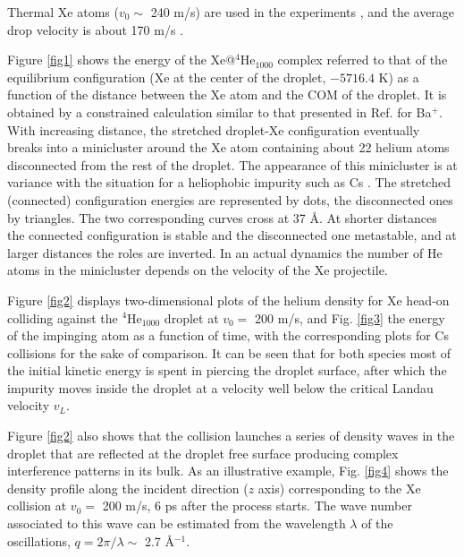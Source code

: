 Thermal Xe atoms ($v_0 \sim$ 240 m/s) are used in the experiments \cite{Gom14,Jon16}, and the average drop velocity is about 170 m/s \cite{Gom11}.

Figure \ref{fig1} shows the energy of  the Xe@$^4$He$_{1000}$ complex  referred to that
of the equilibrium configuration (Xe at the center of the droplet, $-5716.4$ K) 
 as a function of the distance between the Xe  atom and  the COM of the droplet.
It is obtained by a constrained calculation similar to that presented in Ref. \cite{Lea16} for Ba$^+$. 
With increasing distance, the stretched droplet-Xe configuration eventually breaks into a minicluster around the Xe atom containing 
about 22 helium atoms disconnected from the rest of the droplet.
The appearance of this minicluster is at variance with the situation for a heliophobic impurity such as Cs \cite{Lea14}.
The stretched (connected) configuration energies are represented by dots, the disconnected ones by triangles.
The two corresponding curves cross at  37 \AA{}.
At shorter distances the connected configuration is stable and the disconnected one metastable, and at larger distances the roles are inverted.
In an actual dynamics the number of He atoms in the minicluster  depends on the velocity of the Xe projectile.

 Figure \ref{fig2} displays two-dimensional plots of the helium density for Xe  head-on  colliding against the $^4$He$_{1000}$
 droplet at $v_0=$ 200 m/s, and Fig. \ref{fig3} the energy of the impinging atom as a function of time,
 with the corresponding plots for Cs collisions for the sake of comparison.  It can be seen that for both species
 most of the initial kinetic energy is spent in piercing the droplet surface, after which the impurity moves inside the droplet  
at a velocity  well below the critical Landau velocity  $v_L$. 
 
Figure \ref{fig2} also shows that the collision launches a series of density waves in the droplet 
  that are reflected at the droplet free surface producing  complex interference patterns in
 its bulk. As an illustrative example, Fig. \ref{fig4} shows the density profile along the incident direction ($z$ axis) corresponding to the Xe collision at $v_0=$
 200 m/s, 6 ps after the process starts.
 The wave number  associated to this  wave can be estimated from the wavelength $\lambda$  of the 
  oscillations, $q = 2 \pi/\lambda \sim$ 2.7 \AA$^{-1}$.

